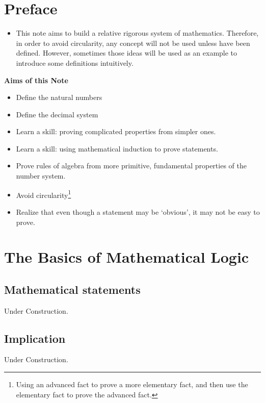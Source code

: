 \documentclass[a4paper]{book}
\begin{document}
		\chapter{Preface}
	\begin{itemize}
		\item This note aims to build a relative rigorous system of mathematics. Therefore, in order to avoid circularity, any concept will not be used unless have been defined. However, sometimes those ideas will be used as an example to introduce some definitions intuitively.
	\end{itemize}
	\textbf{Aims of this Note}
	\begin{itemize}
		\item Define the natural numbers
		\item Define the decimal system
		\item Learn a skill: proving complicated properties from simpler ones.
		\item Learn a skill: using mathematical induction to prove statements.
		\item Prove rules of algebra from more primitive, fundamental properties of the number system.
		\item Avoid circularity\footnote{Using an advanced fact to prove a more elementary fact, and then use the elementary fact to prove the advanced fact.}
		\item Realize that even though a statement may be `obvious', it may not be easy to prove.
	\end{itemize}
	\tableofcontents

	\mainmatter
	\pagestyle{fancy}
	\fancyhf{}
	\cfoot{\thepage}
	\fancyhead[LO]{\slshape \leftmark}
	\fancyhead[LE,RO]{\slshape \rightmark}
	\renewcommand{\headrulewidth}{0pt}

	\chapter{The Basics of Mathematical Logic}
		\section{Mathematical statements}
			Under Construction.
		\section{Implication}
			Under Construction.
\end{document}
